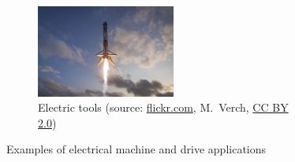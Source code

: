 \begin{frame}
\begin{figure}
		\hfill
		\begin{subfigure}[b]{0.49\textwidth}
			\centering
			\includegraphics[width=0.5\textwidth]{fig/lec01/SpaceX.jpg}
			\caption{Electric tools (source: \href{https://www.flickr.com/photos/30478819@N08/49940384798}{flickr.com},  M.~Verch, \href{https://creativecommons.org/licenses/by/2.0/}{CC BY 2.0})}
		\end{subfigure}
		\caption*{Examples of electrical machine and drive applications} 
        \label{fig:examples_machine_drives_01}
	\end{figure}
\end{frame}


